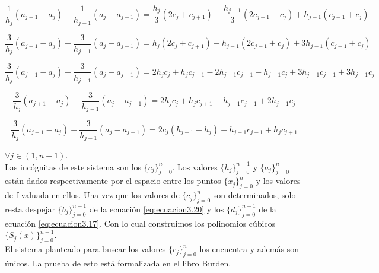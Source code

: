 $$ \frac{1}{h_{j}} (a_{j+1} - a_{j}) - \frac{1}{h_{j-1}} (a_{j} - a_{j-1}) = \frac{h_{j}}{3} (2c_{j} + c_{j+1}) - \frac{h_{j-1}}{3} (2c_{j-1} + c_{j}) + h_{j-1} (c_{j-1} + c_{j})$$

$$ \frac{3}{h_{j}} (a_{j+1} - a_{j}) - \frac{3}{h_{j-1}} (a_{j} - a_{j-1}) = h_{j} (2c_{j} + c_{j+1}) - h_{j-1} (2c_{j-1} + c_{j}) + 3h_{j-1} (c_{j-1} + c_{j}) $$

$$ \frac{3}{h_{j}} (a_{j+1} - a_{j}) - \frac{3}{h_{j-1}} (a_{j} - a_{j-1}) = 2h_{j}c_{j} + h_{j}c_{j+1} - 2h_{j-1}c_{j-1} - h_{j-1}c_{j} + 3h_{j-1}c_{j-1} + 3h_{j-1}c_{j} $$

$$ \frac{3}{h_{j}} (a_{j+1} - a_{j}) - \frac{3}{h_{j-1}} (a_{j} - a_{j-1}) = 2h_{j}c_{j} + h_{j}c_{j+1} + h_{j-1}c_{j-1} + 2h_{j-1}c_{j} $$

\begin{equation}\label{eq:ecuacion3.21}
 \frac{3}{h_{j}} (a_{j+1} - a_{j}) - \frac{3}{h_{j-1}} (a_{j} - a_{j-1}) = 2c_{j}(h_{j-1} + h_{j}) + h_{j-1}c_{j-1} + h_{j}c_{j+1} 
\end{equation}

$\forall j \in (1, n-1)$. \\

Las incógnitas de este sistema son los $\{c_{j}\}_{j=0}^{n}$. Los valores $\{ h_{j}\}_{j=0}^{n-1}$ y $\{ a_{j}\}_{j=0}^{n}$ están dados respectivamente por el espacio entre los puntos $\{x_{j}\}_{j=0}^{n}$ y los valores de f valuada en ellos. Una vez que los valores de $\{c_{j}\}_{j=0}^{n}$ son determinados, solo resta despejar $\{b_{j}\}_{j=0}^{n-1}$ de la ecuación \ref{eq:ecuacion3.20} y los $\{d_{j}\}_{j=0}^{n-1}$ de la ecuación \ref{eq:ecuacion3.17}. Con lo cual construimos los polinomios cúbicos $\{S_{j}(x)\}_{j=0}^{n-1}$. \\

El sistema planteado para buscar los valores $\{c_{j}\}_{j=0}^{n}$ los encuentra y además son únicos. La prueba de esto está formalizada en el libro Burden.